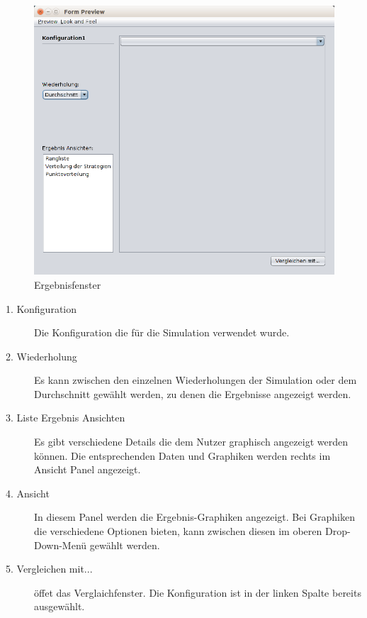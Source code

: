 \begin{figure}[hp] 
  \centering
     \includegraphics[width=1.1\textwidth]{GUI_Entwurf/Ergebnisfenster(1).png}
  \caption{Ergebnisfenster}
  \label{fig:Bild7}
\end{figure}

\begin{description}

\item[1. Konfiguration] Die Konfiguration die für die Simulation verwendet wurde.

\item[2. Wiederholung] Es kann zwischen den einzelnen Wiederholungen der Simulation oder dem Durchschnitt gewählt werden, zu denen die Ergebnisse angezeigt werden.

\item[3. Liste Ergebnis Ansichten] Es gibt verschiedene Details die dem Nutzer graphisch angezeigt werden können. Die entsprechenden Daten und Graphiken werden rechts im Ansicht Panel angezeigt.

\item[4. Ansicht] In diesem Panel werden die Ergebnis-Graphiken angezeigt. Bei Graphiken die verschiedene Optionen bieten, kann zwischen diesen im oberen Drop-Down-Menü gewählt werden.

\item[5. Vergleichen mit...] öffet das Verglaichfenster. Die Konfiguration ist in der linken Spalte bereits ausgewählt.

\end{description}

